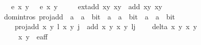 \begin{isabellebody}
\ \ \ {\isachardoublequoteopen}e{\isacharprime}\ x{}\ y{}\ {\isacharequal}\ {}{\isachardoublequoteclose}\ {\isachardoublequoteopen}e{\isacharprime}\ x{}\ y{}\ {\isacharequal}\ {}{\isachardoublequoteclose}\isanewline
\ \ \ {\isachardoublequoteopen}ext{\isacharunderscore}add\ {\isacharparenleft}x{}{\isacharcomma}y{}{\isacharparenright}\ {\isacharparenleft}x{}{\isacharcomma}y{}{\isacharparenright}\ {\isacharequal}\ add\ {\isacharparenleft}x{}{\isacharcomma}y{}{\isacharparenright}\ {\isacharparenleft}x{}{\isacharcomma}y{}{\isacharparenright}{\isachardoublequoteclose}\isanewline
%
\isadelimproof
\ \ %
\endisadelimproof
%
\isatagproof
{}\isamarkupfalse%
%
\endisatagproof
{\isafoldproof}%
%
\isadelimproof
\isanewline
%
\endisadelimproof
\isanewline
{}\isamarkupfalse%
\ {\isacharparenleft}domintros{\isacharparenright}\ proj{\isacharunderscore}add\ {\isacharcolon}{\isacharcolon}\ {\isachardoublequoteopen}{\isacharparenleft}{\isacharprime}a\ {\isasymtimes}\ {\isacharprime}a{\isacharparenright}\ {\isasymtimes}\ bit\ {\isasymRightarrow}\ {\isacharparenleft}{\isacharprime}a\ {\isasymtimes}\ {\isacharprime}a{\isacharparenright}\ {\isasymtimes}\ bit\ {\isasymRightarrow}\ {\isacharparenleft}{\isacharprime}a\ {\isasymtimes}\ {\isacharprime}a{\isacharparenright}\ {\isasymtimes}\ bit{\isachardoublequoteclose}\isanewline
\ \ \ \isanewline
\ \ \ \ {\isachardoublequoteopen}proj{\isacharunderscore}add\ {\isacharparenleft}{\isacharparenleft}x{}{\isacharcomma}\ y{}{\isacharparenright}{\isacharcomma}\ l{\isacharparenright}\ {\isacharparenleft}{\isacharparenleft}x{}{\isacharcomma}\ y{}{\isacharparenright}{\isacharcomma}\ j{\isacharparenright}\ {\isacharequal}\ {\isacharparenleft}add\ {\isacharparenleft}x{}{\isacharcomma}\ y{}{\isacharparenright}\ {\isacharparenleft}x{}{\isacharcomma}\ y{}{\isacharparenright}{\isacharcomma}\ l{\isacharplus}j{\isacharparenright}{\isachardoublequoteclose}\isanewline
\ \ \ \ {\isachardoublequoteopen}delta\ x{}\ y{}\ x{}\ y{}\ {\isasymnoteq}\ {}{\isachardoublequoteclose}\ \ \isanewline
\ \ \ \ \ {\isachardoublequoteopen}{\isacharparenleft}x{}{\isacharcomma}\ y{}{\isacharparenright}\ {\isasymin}\ e{\isacharprime}{\isacharunderscore}aff{\isachardoublequoteclose}\ \ \isanewline

\end{isabellebody}
